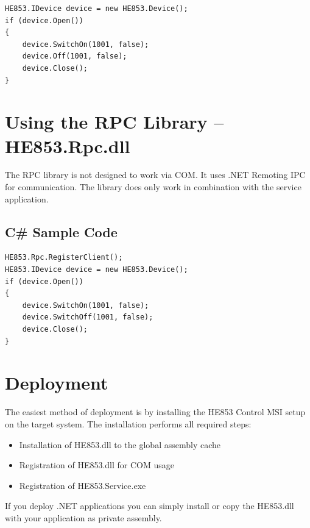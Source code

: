 \documentclass[
a4paper,
oneside,
halfparskip*,
normalheadings,
]
{scrbook}
\begin{document}
\begin{verbatim}
HE853.IDevice device = new HE853.Device();
if (device.Open())
{
    device.SwitchOn(1001, false);
    device.Off(1001, false);
    device.Close();
}
\end{verbatim}

\section{Using the RPC Library -- HE853.Rpc.dll}

The RPC library is not designed to work via COM. It uses .NET Remoting IPC for
communication. The library does only work in combination with the service
application.

\subsection{C\# Sample Code}

\begin{verbatim}
HE853.Rpc.RegisterClient();
HE853.IDevice device = new HE853.Device();
if (device.Open())
{
    device.SwitchOn(1001, false);
    device.SwitchOff(1001, false);
    device.Close();
}
\end{verbatim}

\section{Deployment}
The easiest method of deployment is by installing the HE853 Control MSI setup on the target
system. The installation performs all required steps:

\begin{itemize}
  \item Installation of HE853.dll to the global assembly cache
	\item Registration of HE853.dll for COM usage
	\item Registration of HE853.Service.exe
\end{itemize}

If you deploy .NET applications you can simply install or copy the HE853.dll with your application
as private assembly.
\end{document}
